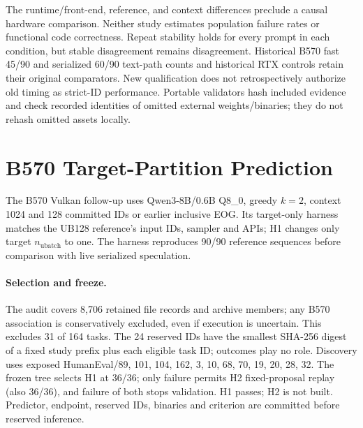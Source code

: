 \documentclass{article}
\begin{document}
The runtime/front-end, reference, and context differences preclude a causal hardware comparison. Neither study estimates population failure rates or functional code correctness. Repeat stability holds for every prompt in each condition, but stable disagreement remains disagreement. Historical B570 fast 45/90 and serialized 60/90 text-path counts and historical RTX controls retain their original comparators. New qualification does not retrospectively authorize old timing as strict-ID performance. Portable validators hash included evidence and check recorded identities of omitted external weights/binaries; they do not rehash omitted assets locally.

\section{B570 Target-Partition Prediction}
The B570 Vulkan follow-up uses Qwen3-8B/0.6B Q8\_0, greedy $k=2$, context 1024 and 128 committed IDs or earlier inclusive EOG. Its target-only harness matches the UB128 reference's input IDs, sampler and APIs; H1 changes only target $n_{\mathrm{ubatch}}$ to one. The harness reproduces 90/90 reference sequences before comparison with live serialized speculation.

\paragraph{Selection and freeze.}
The audit covers 8,706 retained file records and archive members; any B570 association is conservatively excluded, even if execution is uncertain. This excludes 31 of 164 tasks. The 24 reserved IDs have the smallest SHA-256 digest of a fixed study prefix plus each eligible task ID; outcomes play no role. Discovery uses exposed HumanEval/89, 101, 104, 162, 3, 10, 68, 70, 19, 20, 28, 32. The frozen tree selects H1 at 36/36; only failure permits H2 fixed-proposal replay (also 36/36), and failure of both stops validation. H1 passes; H2 is not built. Predictor, endpoint, reserved IDs, binaries and criterion are committed before reserved inference.
\end{document}
